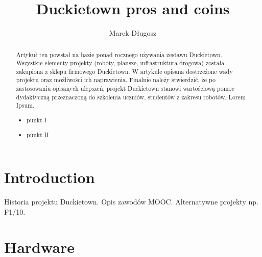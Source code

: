 \documentclass{svproc}
\begin{document}
\mainmatter              %
%
\title{Duckietown pros and coins}
%
%
\author{Marek Długosz}
%
%
%

\maketitle              %

\begin{abstract}
Artykuł ten powstał na bazie ponad rocznego używania zestawu Duckietown. Wszystkie elementy projekty (roboty, plansze, infrastruktura drogowa) została zakupiona z sklepu firmowego Duckietown.
W artykule opisana dostrzeżone wady projektu oraz możliwości ich naprawienia.
Finalnie należy stwierdzić, że po zastosowaniu opisanych ulepszeń, projekt Duckietown stanowi wartościową pomoc dydaktyczną przeznaczoną do szkolenia uczniów, studentów z zakresu robotów.
Lorem Ipsum.
\begin{itemize}
    \item punkt I
    \item punkt II
\end{itemize}
\end{abstract}
%
\section{Introduction}
Historia projektu Duckietown. Opis zawodów MOOC.
Alternatywne projekty np. F1/10.

\section{Hardware}
\end{document}
